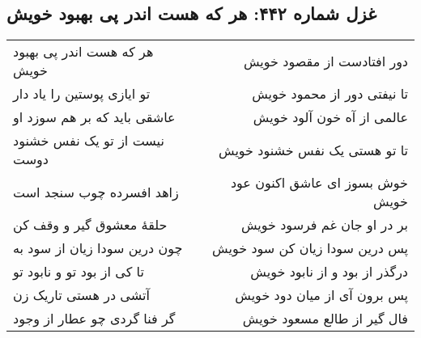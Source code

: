 \begin{center}
\section*{غزل شماره ۴۴۲: هر که هست اندر پی بهبود خویش}
\label{sec:442}
\begin{longtable}{l p{0.5cm} r}
هر که هست اندر پی بهبود خویش
&&
دور افتادست از مقصود خویش
\\
تو ایازی پوستین را یاد دار
&&
تا نیفتی دور از محمود خویش
\\
عاشقی باید که بر هم سوزد او
&&
عالمی از آه خون آلود خویش
\\
نیست از تو یک نفس خشنود دوست
&&
تا تو هستی یک نفس خشنود خویش
\\
زاهد افسرده چوب سنجد است
&&
خوش بسوز ای عاشق اکنون عود خویش
\\
حلقهٔ معشوق گیر و وقف کن
&&
بر در او جان غم فرسود خویش
\\
چون درین سودا زیان از سود به
&&
پس درین سودا زیان کن سود خویش
\\
تا کی از بود تو و نابود تو
&&
درگذر از بود و از نابود خویش
\\
آتشی در هستی تاریک زن
&&
پس برون آی از میان دود خویش
\\
گر فنا گردی چو عطار از وجود
&&
فال گیر از طالع مسعود خویش
\\
\end{longtable}
\end{center}
